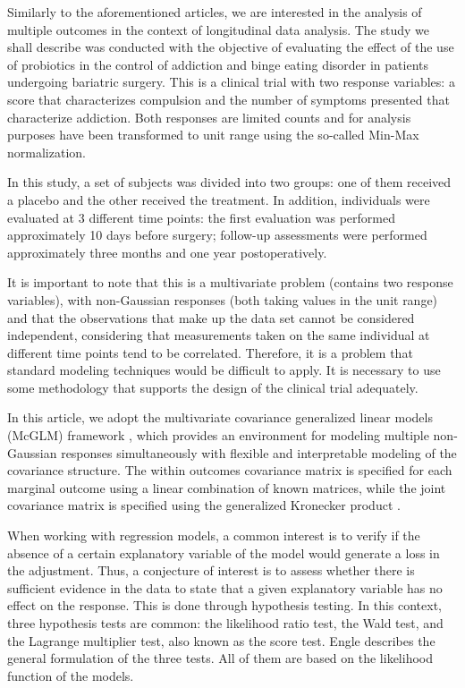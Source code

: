 \documentclass[USenglish]{article}
\theoremstyle{dgthm}
\theoremstyle{dgdef}
\begin{document}

Similarly to the aforementioned articles, we are interested in the analysis of multiple outcomes in the context of longitudinal data analysis. The study we shall describe was conducted with the objective of evaluating the effect of the use of probiotics in the control of addiction and binge eating disorder in patients undergoing bariatric surgery. This is a clinical trial with two response variables: a score that characterizes compulsion and the number of symptoms presented that characterize addiction. Both responses are limited counts and for analysis purposes have been transformed to unit range using the so-called Min-Max normalization.

In this study, a set of subjects was divided into two groups: one of them received a placebo and the other received the treatment. In addition, individuals were evaluated at 3 different time points: the first evaluation was performed approximately 10 days before surgery; follow-up assessments were performed approximately three months and one year postoperatively.


It is important to note that this is a multivariate problem (contains two response variables), with non-Gaussian responses (both taking values in the unit range) and that the observations that make up the data set cannot be considered independent, considering that measurements taken on the same individual at different time points tend to be correlated. Therefore, it is a problem that standard modeling techniques would be difficult to apply. It is necessary to use some methodology that supports the design of the clinical trial adequately.

In this article, we adopt the multivariate covariance generalized linear models (McGLM) framework \cite{Bonat16}, which provides an environment for modeling multiple non-Gaussian responses simultaneously with flexible and interpretable modeling of the covariance structure. The within outcomes covariance matrix is specified for each marginal outcome using a linear combination of known matrices, while the joint covariance matrix is specified using the generalized Kronecker product \cite{martinez13,Bonat16}.


When working with regression models, a common interest is to verify if the absence of a certain explanatory variable of the model would generate a loss in the adjustment. Thus, a conjecture of interest is to assess whether there is sufficient evidence in the data to state that a given explanatory variable has no effect on the response. This is done through hypothesis testing. In this context, three hypothesis tests are common: the likelihood ratio test, the Wald test, and the Lagrange multiplier test, also known as the score test. Engle \cite{engle} describes the general formulation of the three tests. All of them are based on the likelihood function of the models. 
\end{document}
